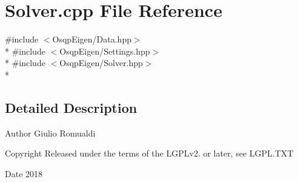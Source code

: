 \section{Solver.\+cpp File Reference}
\label{Solver_8cpp}
{\ttfamily \#include $<$Osqp\+Eigen/\+Data.\+hpp$>$}\\*
{\ttfamily \#include $<$Osqp\+Eigen/\+Settings.\+hpp$>$}\\*
{\ttfamily \#include $<$Osqp\+Eigen/\+Solver.\+hpp$>$}\\*


\subsection{Detailed Description}
\begin{DoxyAuthor}{Author}
Giulio Romualdi 
\end{DoxyAuthor}
\begin{DoxyCopyright}{Copyright}
Released under the terms of the L\+G\+P\+Lv2. or later, see L\+G\+P\+L.\+T\+XT 
\end{DoxyCopyright}
\begin{DoxyDate}{Date}
2018 
\end{DoxyDate}
